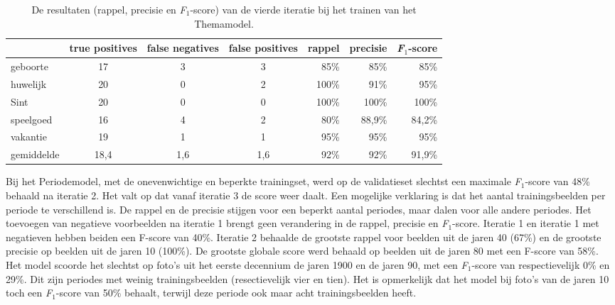 \begin{table}
    \centering
    \renewcommand\arraystretch{1.2}
    \begin{tabular}{l|ccc|rrr}
        \toprule
        & true positives  & false negatives & false positives & rappel & precisie & \textit{F$_{1}$}-score \\
        \midrule
        geboorte & 17 & 3 & 3 & 85\% & 85\% & 85\% \\
        huwelijk & 20 & 0 & 2 & 100\% & 91\% & 95\% \\
        Sint & 20 & 0 & 0 & 100\% & 100\% & 100\% \\
        speelgoed & 16 & 4 & 2 & 80\% & 88,9\% & 84,2\% \\
        vakantie & 19 & 1 & 1 & 95\% & 95\% & 95\% \\
        \midrule
        gemiddelde & 18,4 & 1,6 & 1,6 & 92\% & 92\% & 91,9\% \\
        \bottomrule
    \end{tabular}
    \caption{De resultaten (rappel, precisie en \textit{F$_{1}$}-score) van de vierde iteratie bij het trainen van het Themamodel.}
    \label{tab:validatie-iteratie4-themamodel}
\end{table}

Bij het Periodemodel, met de onevenwichtige en beperkte trainingset, werd op de validatieset slechtst een maximale \textit{F$_{1}$}-score van 48\% behaald na iteratie 2. Het valt op dat vanaf iteratie 3 de score weer daalt. Een mogelijke verklaring is dat het aantal trainingsbeelden per periode te verschillend is. De rappel en de precisie stijgen voor een beperkt aantal periodes, maar dalen voor alle andere periodes. Het toevoegen van negatieve voorbeelden na iteratie 1 brengt geen verandering in de rappel, precisie en \textit{F$_{1}$}-score. Iteratie 1 en iteratie 1 met negatieven hebben beiden een F-score van 40\%. Iteratie 2 behaalde de grootste rappel voor beelden uit de jaren 40 (67\%) en de grootste precisie op beelden uit de jaren 10 (100\%). De grootste globale score werd behaald op beelden uit de jaren 80 met een F-score van 58\%. Het model scoorde het slechtst op foto’s uit het eerste decennium de jaren 1900 en de jaren 90, met een \textit{F$_{1}$}-score van respectievelijk 0\% en 29\%. Dit zijn periodes met weinig trainingsbeelden (resectievelijk vier en tien). Het is opmerkelijk dat het model bij foto's van de jaren 10 toch een \textit{F$_{1}$}-score van 50\% behaalt, terwijl deze periode ook maar acht trainingsbeelden heeft.

